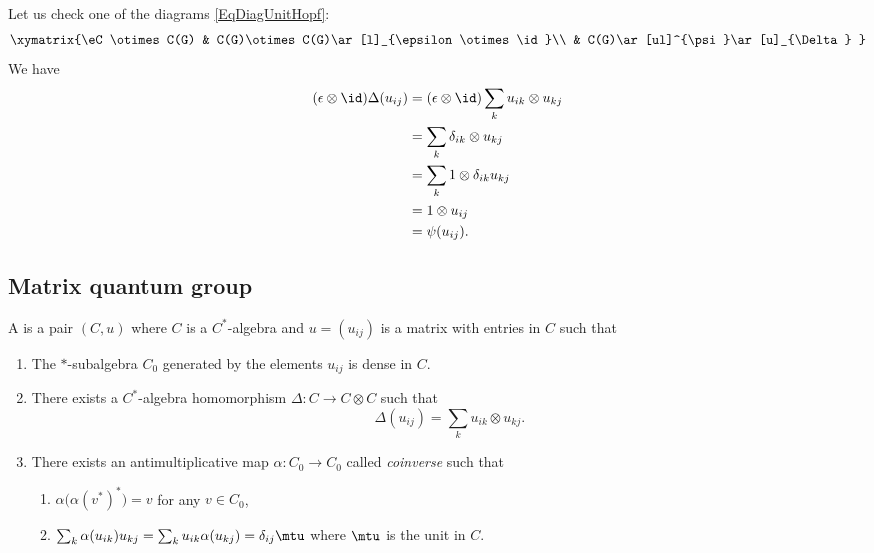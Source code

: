 Let us check one of the diagrams \eqref{EqDiagUnitHopf}:
\begin{equation}
	\xymatrix{%
		\eC\otimes C(G)     &   C(G)\otimes C(G)\ar[l]_{\epsilon\otimes\id}\\
		&   C(G)\ar[ul]^{\psi}\ar[u]_{\Delta}
	}
\end{equation}
We have
\begin{equation}
	\begin{aligned}[]
		(\epsilon\otimes\id)\Delta(u_{ij}) & =(\epsilon\otimes\id)\sum_k u_{ik}\otimes u_{kj} \\
		                                   & =\sum_k\delta_{ik}\otimes u_{kj}                 \\
		                                   & =\sum_k1\otimes \delta_{ik}u_{kj}                \\
		                                   & =1\otimes u_{ij}                                 \\
		                                   & =\psi(u_{ij}).
	\end{aligned}
\end{equation}

\subsection{Matrix quantum group}

\begin{definition}      \label{DefQuantumMatrixGroup}
	A  is a pair $(C,u)$ where $C$ is a $C^*$-algebra and $u=(u_{ij})$ is a matrix with entries in $C$ such that
	\begin{enumerate}
		\item
		      The $*$-subalgebra $C_0$ generated by the elements $u_{ij}$ is dense in $C$.
		\item
		      There exists a $C^*$-algebra homomorphism $\Delta\colon C\to C\otimes C$ such that
		      \begin{equation}
			      \Delta(u_{ij})=\sum_k u_{ik}\otimes u_{kj}.
		      \end{equation}
		      \item\label{DefQuantumMatrixGroupItemiii}
		      There exists an antimultiplicative map $\alpha\colon C_0\to C_0$ called \emph{coinverse} such that
		      \begin{enumerate}
			      \item
			            $\alpha\big( \alpha(v^*)^* \big)=v$ for any $v\in C_0$,
			      \item
			            $\sum_k\alpha(u_{ik})u_{kj}=\sum_ku_{ik}\alpha(u_{kj})=\delta_{ij}\mtu$ where $\mtu$ is the unit in $C$.
		      \end{enumerate}
	\end{enumerate}
\end{definition}

